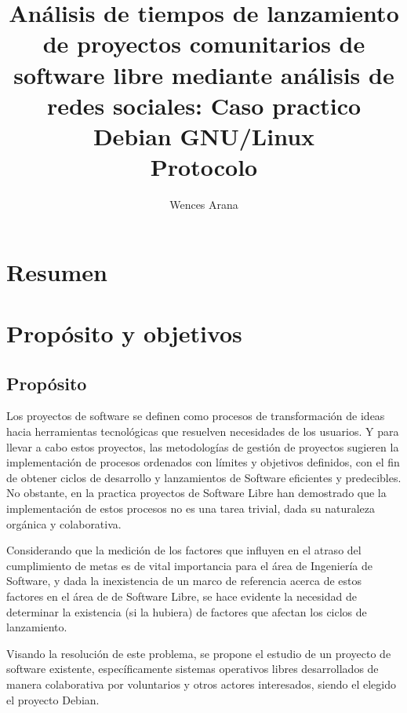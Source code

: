 \documentclass[12pt]{report}
\begin{document}
  \title{ {Análisis  de  tiempos  de  lanzamiento  de
proyectos comunitarios  de software  libre mediante análisis  de redes
sociales:   Caso   practico    Debian   GNU/Linux}
\\   {Protocolo}   }
\author{Wences Arana}
\maketitle

\tableofcontents

\chapter*{Resumen}

\chapter*{Propósito y objetivos}

\section*{Propósito}
Los proyectos de software se definen como procesos de  transformación 
de ideas hacia herramientas tecnológicas que resuelven necesidades de 
los usuarios. Y para llevar a cabo estos proyectos, las metodologías 
de gestión de proyectos sugieren la implementación de  procesos  
ordenados con límites y objetivos definidos, con el fin de obtener 
ciclos de desarrollo y lanzamientos de Software eficientes y 
predecibles.   No obstante, en la practica proyectos de Software 
Libre han demostrado que la implementación 
de estos procesos no  es una tarea trivial, dada su naturaleza  
orgánica y colaborativa.

Considerando que la medición de los factores que  influyen en el 
atraso  del cumplimiento de metas es de vital importancia para el 
área de  Ingeniería de Software, y dada la inexistencia de un marco 
de referencia acerca de estos factores en el área de de Software 
Libre, se hace evidente la necesidad de determinar la existencia (si 
la hubiera) de factores que afectan los ciclos de lanzamiento.

Visando la resolución de este problema, se propone el 
estudio de un proyecto de software existente, específicamente
sistemas operativos  libres  desarrollados de manera colaborativa por
voluntarios y  otros actores  interesados, siendo el elegido el 
proyecto Debian.
\end{document}
